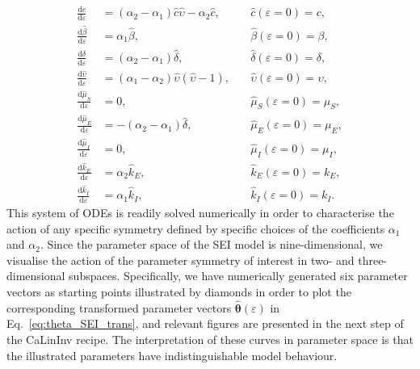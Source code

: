 \documentclass[12pt]{article}
\begin{document}
\begin{align}
  \frac{\mathrm{d}\hat{c}}{\mathrm{d}\varepsilon}&=(\alpha_{2}-\alpha_{1})\hat{c}\hat{\upsilon}-\alpha_{2}\hat{c},\quad&\hat{c}(\varepsilon=0)=c,\label{eq:trans_c}\\
  \frac{\mathrm{d}\hat{\beta}}{\mathrm{d}\varepsilon}&=\alpha_{1}\hat{\beta},\quad&\hat{\beta}(\varepsilon=0)=\beta,\label{eq:trans_beta}\\
  \frac{\mathrm{d}\hat{\delta}}{\mathrm{d}\varepsilon}&=(\alpha_{2}-\alpha_{1})\hat{\delta},\quad&\hat{\delta}(\varepsilon=0)=\delta,\label{eq:trans_delta}\\
  \frac{\mathrm{d}\hat{\upsilon}}{\mathrm{d}\varepsilon}&=(\alpha_{1}-\alpha_{2})\hat{\upsilon} \left(\hat{\upsilon} - 1\right),\quad&\hat{\upsilon}(\varepsilon=0)=\upsilon,\label{eq:trans_epsilon}\\
  \frac{\mathrm{d}\hat{\mu}_{S}}{\mathrm{d}\varepsilon}&=0,\quad&\hat{\mu}_{S}(\varepsilon=0)=\mu_{S},\label{eq:trans_muS}\\
  \frac{\mathrm{d}\hat{\mu}_{E}}{\mathrm{d}\varepsilon}&=-(\alpha_{2}-\alpha_{1})\hat{\delta},\quad&\hat{\mu}_{E}(\varepsilon=0)=\mu_{E},\label{eq:trans_muE}\\
  \frac{\mathrm{d}\hat{\mu}_{I}}{\mathrm{d}\varepsilon}&=0,\quad&\hat{\mu}_{I}(\varepsilon=0)=\mu_{I},\label{eq:trans_muI}\\
  \frac{\mathrm{d}\hat{k}_{E}}{\mathrm{d}\varepsilon}&=\alpha_{2}\hat{k}_{E},\quad&\hat{k}_{E}(\varepsilon=0)=k_{E},\label{eq:trans_kE}\\
  \frac{\mathrm{d}\hat{k}_{I}}{\mathrm{d}\varepsilon}&=\alpha_{1}\hat{k}_{I},\quad&\hat{k}_{I}(\varepsilon=0)=k_{I}.\label{eq:trans_kI}  
\end{align}
This system of ODEs is readily solved numerically in order to characterise the action of any specific symmetry defined by specific choices of the coefficients $\alpha_{1}$ and $\alpha_{2}$. Since the parameter space of the SEI model is nine-dimensional, we visualise the action of the parameter symmetry of interest in two- and three-dimensional subspaces. Specifically, we have numerically generated six parameter vectors as starting points illustrated by diamonds in order to plot the corresponding transformed parameter vectors $\hat{\boldsymbol{\theta}}(\varepsilon)$ in Eq.~\eqref{eq:theta_SEI_trans}, and relevant figures are presented in the next step of the CaLinInv recipe. The interpretation of these curves in parameter space is that the illustrated parameters have indistinguishable model behaviour.    
\end{document}
